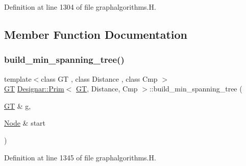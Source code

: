Definition at line 1304 of file graphalgorithms.\+H.



\subsection{Member Function Documentation}
\mbox{\label{class_designar_1_1_prim_a39e561f33cf1a98dc599d81f01948a16}} 
\subsubsection{\texorpdfstring{build\+\_\+min\+\_\+spanning\+\_\+tree()}{build\_min\_spanning\_tree()}\hspace{0.1cm}{\footnotesize\ttfamily [1/2]}}
{\footnotesize\ttfamily template$<$class GT , class Distance , class Cmp $>$ \\
\hyperlink{demo-buildgraph_8_c_a3001c40d2c31ca87ed96cd7d1334a55e}{GT} \hyperlink{class_designar_1_1_prim}{Designar\+::\+Prim}$<$ \hyperlink{demo-buildgraph_8_c_a3001c40d2c31ca87ed96cd7d1334a55e}{GT}, Distance, Cmp $>$\+::build\+\_\+min\+\_\+spanning\+\_\+tree (\begin{DoxyParamCaption}\item[{\hyperlink{demo-buildgraph_8_c_a3001c40d2c31ca87ed96cd7d1334a55e}{GT} \&}]{g,  }\item[{\hyperlink{class_designar_1_1_prim_a61fb55303a5350e0a6dadd5472571ba6}{Node} \&}]{start }\end{DoxyParamCaption})}



Definition at line 1345 of file graphalgorithms.\+H.

\mbox{\label{class_designar_1_1_prim_a57b6f5db0d64fc287fc6beb5ffb3713d}} 
